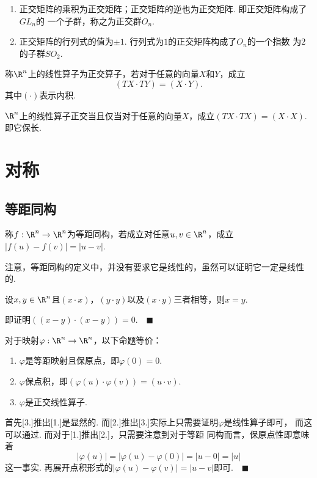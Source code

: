   \begin{pos}
    $\,$
    \begin{enumerate}
      \item 正交矩阵的乘积为正交矩阵；正交矩阵的逆也为正交矩阵. 即正交矩阵构成了$GL_n$的
        一个子群，称之为正交群$O_n$.
      \item 正交矩阵的行列式的值为$\pm 1$. 行列式为$1$的正交矩阵构成了$O_n$的一个指数
        为$2$的子群$SO_2$.
    \end{enumerate}
  \end{pos}

  \begin{defi}[正交算子]
    称$\R^n$上的线性算子为正交算子，若对于任意的向量$X$和$Y$，成立
    \[
      (TX\cdot TY) = (X\cdot Y).
    \]
    其中$(\cdot)$表示内积.
  \end{defi}

  \begin{thm}
    $\R^n$上的线性算子正交当且仅当对于任意的向量$X$，成立$(TX\cdot TX)=(X\cdot X)$. 
    即它保长.
  \end{thm}



\newpage
\section{对称}

\subsection{等距同构}

  \begin{defi}[等距同构]
    称$f:\R^n\to\R^n$为等距同构，若成立对任意$u,v\in\R^n$，成立$|f(u)-f(v)|=|u-v|$.
  \end{defi}
  \remark
    注意，等距同构的定义中，并没有要求它是线性的，虽然可以证明它一定是线性的.

  \begin{lemma}
    \label{lemma: 向量相等}
    设$x,y\in\R^n$且$(x\cdot x)$，$(y\cdot y)$以及$(x\cdot y)$三者相等，则$x=y$.
  \end{lemma}
  \proof 即证明$((x-y)\cdot (x-y))=0$.$\quad\blacksquare$
  
  \begin{thm}
    对于映射$\varphi:\R^n\to\R^n$，以下命题等价：
    \begin{enumerate}
      \item $\varphi$是等距映射且保原点，即$\varphi(0)=0$.
      \item $\varphi$保点积，即$(\varphi(u)\cdot\varphi(v))=(u\cdot v)$.
      \item $\varphi$是正交线性算子.
    \end{enumerate}
  \end{thm}
  \proof
    首先[3.]推出[1.]是显然的. 而[2.]推出[3.]实际上只需要证明$\varphi$是线性算子即可，
    而这可以通过. 而对于[1.]推出[2.]，只需要注意到对于等距
    同构而言，保原点性即意味着
    \[
      |\varphi(u)| = |\varphi(u)-\varphi(0)| = |u-0| = |u|
    \]
    这一事实. 再展开点积形式的$|\varphi(u)-\varphi(v)|=|u-v|$即可.$\quad\blacksquare$

